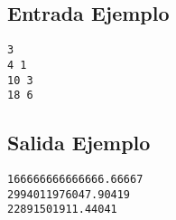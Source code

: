 \begin{multicols}{2}

\subsection*{Entrada Ejemplo}

\begin{verbatim}
3
4 1
10 3
18 6
\end{verbatim}

\columnbreak

\subsection*{Salida Ejemplo}

\begin{verbatim}
166666666666666.66667
2994011976047.90419
22891501911.44041
\end{verbatim}

\end{multicols}